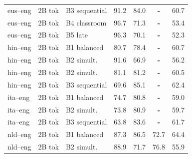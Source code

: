\begin{table}[t]
\begin{tabular}{lll cc cc}
eus--eng  & 2B tok & B3 sequential & \cellcolor[rgb]{0.772,1.000,0.772} 91.2 & \cellcolor[rgb]{0.815,1.000,0.815} 84.0 & \textbf{-} & \cellcolor[rgb]{0.912,1.000,0.912} 60.7 \\
eus--eng & 2B tok & B4 classroom & \cellcolor[rgb]{0.742,1.000,0.742} 96.7 & \cellcolor[rgb]{0.884,1.000,0.884} 71.3 & \textbf{-} & \cellcolor[rgb]{0.972,1.000,0.972} 53.4 \\
eus--eng & 2B tok & B5 late & \cellcolor[rgb]{0.744,1.000,0.744} 96.3 & \cellcolor[rgb]{0.890,1.000,0.890} 70.1 & \textbf{-} & \cellcolor[rgb]{0.981,1.000,0.981} 52.3 \\
hin--eng  & 2B tok & B1 balanced & \cellcolor[rgb]{0.830,1.000,0.830} 80.7 & \cellcolor[rgb]{0.845,1.000,0.845} 78.4 & \textbf{-} & \cellcolor[rgb]{0.912,1.000,0.912} 60.7 \\
hin--eng & 2B tok & B2 simult. & \cellcolor[rgb]{0.770,1.000,0.770} 91.6 & \cellcolor[rgb]{0.908,1.000,0.908} 66.9 & \textbf{-} & \cellcolor[rgb]{0.949,1.000,0.949} 56.2 \\
hin--eng  & 2B tok & B2 simult. & \cellcolor[rgb]{0.828,1.000,0.828} 81.1 & \cellcolor[rgb]{0.830,1.000,0.830} 81.2 & \textbf{-} & \cellcolor[rgb]{0.914,1.000,0.914} 60.5 \\
hin--eng  & 2B tok & B3 sequential & \cellcolor[rgb]{0.892,1.000,0.892} 69.6 & \cellcolor[rgb]{0.809,1.000,0.809} 85.1 & \textbf{-} & \cellcolor[rgb]{0.898,1.000,0.898} 62.4 \\
ita--eng  & 2B tok & B1 balanced & \cellcolor[rgb]{0.863,1.000,0.863} 74.7 & \cellcolor[rgb]{0.832,1.000,0.832} 80.8 & \textbf{-} & \cellcolor[rgb]{0.926,1.000,0.926} 59.0 \\
ita--eng  & 2B tok & B2 simult. & \cellcolor[rgb]{0.868,1.000,0.868} 73.8 & \cellcolor[rgb]{0.831,1.000,0.831} 80.9 & \textbf{-} & \cellcolor[rgb]{0.920,1.000,0.920} 59.7 \\
ita--eng  & 2B tok & B3 sequential & \cellcolor[rgb]{0.924,1.000,0.924} 63.8 & \cellcolor[rgb]{0.817,1.000,0.817} 83.6 & \textbf{-} & \cellcolor[rgb]{0.904,1.000,0.904} 61.7 \\
nld--eng & 2B tok & B1 balanced & \cellcolor[rgb]{0.794,1.000,0.794} 87.3 & \cellcolor[rgb]{0.801,1.000,0.801} 86.5 & \cellcolor[rgb]{0.839,1.000,0.839} 72.7 & \cellcolor[rgb]{0.881,1.000,0.881} 64.4 \\
nld--eng & 2B tok & B2 simult. & \cellcolor[rgb]{0.785,1.000,0.785} 88.9 & \cellcolor[rgb]{0.882,1.000,0.882} 71.7 & \cellcolor[rgb]{0.810,1.000,0.810} 76.8 & \cellcolor[rgb]{0.951,1.000,0.951} 55.9 \\

\end{tabular}
\end{table}
